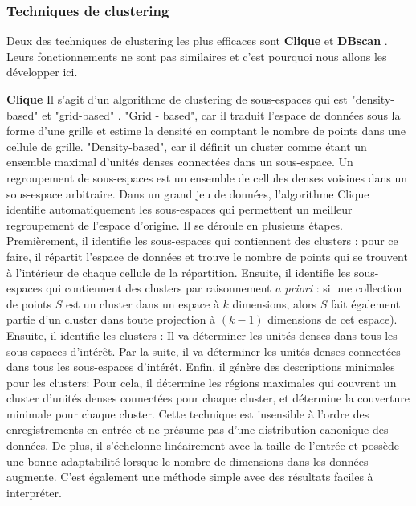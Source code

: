 \subsubsection{Techniques de clustering}
Deux des techniques de clustering les plus efficaces sont \textbf{Clique} et \textbf{DBscan} \cite{abbas2019clustme}. Leurs fonctionnements ne sont pas similaires et c’est pourquoi nous allons les développer ici.
\medskip

\textbf{Clique} \newline
Il s'agit d'un algorithme de clustering de sous-espaces qui est "density-based" et "grid-based" .\newline
"Grid - based", car il traduit l'espace de données sous la forme d'une grille et estime la densité en comptant le nombre de points dans une cellule de grille.\newline
"Density-based", car il définit un cluster comme étant un ensemble maximal d'unités denses connectées dans un sous-espace.\newline
Un regroupement de sous-espaces est un ensemble de cellules denses voisines dans un sous-espace arbitraire.\newline
\newline
Dans un grand jeu de données, l'algorithme Clique identifie automatiquement les sous-espaces qui permettent un meilleur regroupement de l'espace d’origine.
\newline
Il se déroule en plusieurs étapes. Premièrement, il identifie les sous-espaces qui contiennent des clusters :\newline
pour ce faire, il répartit l'espace de données et trouve le nombre de points qui se trouvent à l'intérieur de chaque cellule de la répartition. Ensuite, il identifie les sous-espaces qui contiennent des clusters par raisonnement \textit{a priori} : si une collection de points $S$ est un cluster dans un espace à $k$ dimensions, alors $S$ fait également partie d'un cluster dans toute projection à $(k-1)$ dimensions de cet espace).\newline
Ensuite, il identifie les clusters :\newline
Il va déterminer les unités denses dans tous les sous-espaces d’intérêt. Par la suite, il va déterminer les unités denses connectées dans tous les sous-espaces d’intérêt. \newline
Enfin, il génère des descriptions minimales pour les clusters: \newline
Pour cela, il détermine les régions maximales qui couvrent un cluster d'unités denses connectées pour chaque cluster, et détermine la couverture minimale pour chaque cluster.
\newline
Cette technique est insensible à l'ordre des enregistrements en entrée et ne présume pas d'une distribution canonique des données. De plus, il s'échelonne linéairement avec la taille de l'entrée et possède une bonne adaptabilité lorsque le nombre de dimensions dans les données augmente.
C’est également une méthode simple avec des résultats faciles à interpréter\cite{agrawal1998automatic}.

